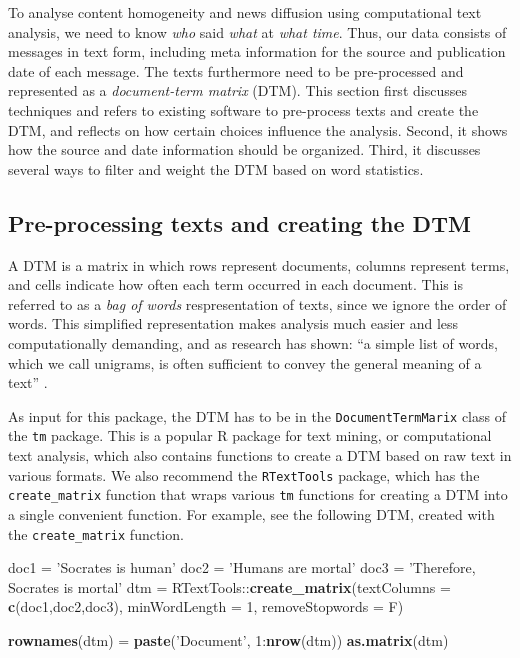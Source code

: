 \documentclass[]{article}
\newenvironment{Shaded}{\begin{snugshade}}{\end{snugshade}}
\newcommand{\KeywordTok}[1]{\textcolor[rgb]{0.13,0.29,0.53}{\textbf{{#1}}}}
\newcommand{\DataTypeTok}[1]{\textcolor[rgb]{0.13,0.29,0.53}{{#1}}}
\newcommand{\DecValTok}[1]{\textcolor[rgb]{0.00,0.00,0.81}{{#1}}}
\newcommand{\StringTok}[1]{\textcolor[rgb]{0.31,0.60,0.02}{{#1}}}
\newcommand{\NormalTok}[1]{{#1}}
\begin{document}
To analyse content homogeneity and news diffusion using computational
text analysis, we need to know \emph{who} said \emph{what} at \emph{what
time}. Thus, our data consists of messages in text form, including meta
information for the source and publication date of each message. The
texts furthermore need to be pre-processed and represented as a
\emph{document-term matrix} (DTM). This section first discusses
techniques and refers to existing software to pre-process texts and
create the DTM, and reflects on how certain choices influence the
analysis. Second, it shows how the source and date information should be
organized. Third, it discusses several ways to filter and weight the DTM
based on word statistics.

\subsection{Pre-processing texts and creating the
DTM}\label{pre-processing-texts-and-creating-the-dtm}

A DTM is a matrix in which rows represent documents, columns represent
terms, and cells indicate how often each term occurred in each document.
This is referred to as a \emph{bag of words} respresentation of texts,
since we ignore the order of words. This simplified representation makes
analysis much easier and less computationally demanding, and as research
has shown: ``a simple list of words, which we call unigrams, is often
sufficient to convey the general meaning of a text''
\citep[6]{grimmer13}.

As input for this package, the DTM has to be in the
\texttt{DocumentTermMarix} class of the \texttt{tm} package. This is a
popular R package for text mining, or computational text analysis, which
also contains functions to create a DTM based on raw text in various
formats. We also recommend the \texttt{RTextTools} package, which has
the \texttt{create\_matrix} function that wraps various \texttt{tm}
functions for creating a DTM into a single convenient function. For
example, see the following DTM, created with the \texttt{create\_matrix}
function.

\begin{Shaded}
\begin{Highlighting}[]
\NormalTok{doc1 =}\StringTok{ 'Socrates is human'}
\NormalTok{doc2 =}\StringTok{ 'Humans are mortal'}
\NormalTok{doc3 =}\StringTok{ 'Therefore, Socrates is mortal'}
\NormalTok{dtm =}\StringTok{ }\NormalTok{RTextTools::}\KeywordTok{create_matrix}\NormalTok{(}\DataTypeTok{textColumns =} \KeywordTok{c}\NormalTok{(doc1,doc2,doc3), }
                                \DataTypeTok{minWordLength =} \DecValTok{1}\NormalTok{, }\DataTypeTok{removeStopwords =} \NormalTok{F)}

\KeywordTok{rownames}\NormalTok{(dtm) =}\StringTok{ }\KeywordTok{paste}\NormalTok{(}\StringTok{'Document'}\NormalTok{, }\DecValTok{1}\NormalTok{:}\KeywordTok{nrow}\NormalTok{(dtm))}
\KeywordTok{as.matrix}\NormalTok{(dtm)}
\end{Highlighting}
\end{Shaded}
\end{document}
